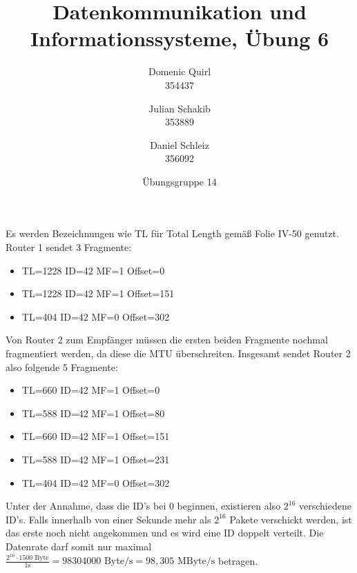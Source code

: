 \documentclass{../exercisesheet}
\title{Datenkommunikation und Informationssysteme, Übung 6}
\author{
    Domenic Quirl \\ 354437
    \and
    Julian Schakib \\ 353889
    \and 
    Daniel Schleiz \\ 356092
}
\date{Übungsgruppe 14}
\begin{document}
\maketitle
\pointtable


\begin{exercise}{4}
\begin{subexercise}

\end{subexercise}
\begin{subexercise}

\end{subexercise}
\begin{subexercise}

\end{subexercise}
\end{exercise}


\begin{exercise}{6}
\begin{subexercise}
Es werden Bezeichnungen wie TL für Total Length gemäß Folie IV-50 genutzt.\\
	Router 1 sendet 3 Fragmente:
	\begin{itemize}
	\item TL=1228 ID=42 MF=1 Offset=0
	\item TL=1228 ID=42 MF=1 Offset=151
	\item TL=404 ID=42 MF=0 Offset=302
	\end{itemize}
	Von Router 2 zum Empfänger müssen die ersten beiden Fragmente nochmal fragmentiert werden, da diese die MTU überschreiten. Insgesamt sendet Router 2 also folgende
	5 Fragmente:
	\begin{itemize}
	\item TL=660 ID=42 MF=1 Offset=0
	\item TL=588 ID=42 MF=1 Offset=80
	\item TL=660 ID=42 MF=1 Offset=151
	\item TL=588 ID=42 MF=1 Offset=231
	\item TL=404 ID=42 MF=0 Offset=302
	\end{itemize}
\end{subexercise}
\begin{subexercise}
Unter der Annahme, dass die ID's bei 0 beginnen, existieren also $2^{16}$ verschiedene ID's. Falls innerhalb von einer Sekunde mehr als $2^{16}$ Pakete verschickt werden, ist das erste
noch nicht angekommen und es wird eine ID doppelt verteilt. Die Datenrate darf somit nur maximal $\frac{2^{16} \cdot 1500 \text{ Byte}}{1\text{s}}= 
98304000 \text{ Byte/s}= 98,305 \text{ MByte/s}$ betragen.

\end{subexercise}
\end{exercise}
\end{document}
